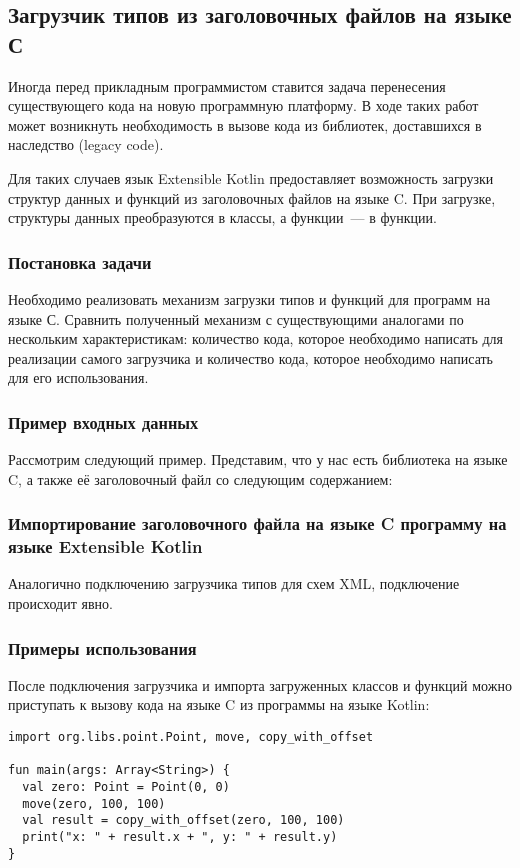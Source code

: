 \subsection{Загрузчик типов из заголовочных файлов на языке С}
Иногда перед прикладным программистом ставится задача перенесения существующего кода на новую программную платформу.
В ходе таких работ может возникнуть необходимость в вызове кода из библиотек, доставшихся в наследство (legacy code).

Для таких случаев язык Extensible Kotlin предоставляет возможность загрузки структур данных и функций из заголовочных файлов на языке C.
При загрузке, структуры данных преобразуются в классы, а функции~--- в функции.

\subsubsection{Постановка задачи}
\td Необходимо реализовать механизм загрузки типов и функций для программ на языке С. Сравнить полученный механизм с существующими аналогами по нескольким характеристикам: количество кода, которое необходимо написать для реализации самого загрузчика и количество кода, которое необходимо написать для его использования.

\subsubsection{Пример входных данных}
Рассмотрим следующий пример. Представим, что у нас есть библиотека на языке C, а также её заголовочный файл со следующим содержанием:


\subsubsection{Импортирование заголовочного файла на языке C программу на языке Extensible Kotlin}
Аналогично подключению загрузчика типов для схем XML, подключение происходит явно. \td

\subsubsection{Примеры использования}
После подключения загрузчика и импорта загруженных классов и функций можно приступать к вызову кода на языке C из программы на языке Kotlin:
\begin{lstlisting}
import org.libs.point.Point, move, copy_with_offset

fun main(args: Array<String>) {
  val zero: Point = Point(0, 0)
  move(zero, 100, 100)
  val result = copy_with_offset(zero, 100, 100)
  print("x: " + result.x + ", y: " + result.y)
}
\end{lstlisting}
